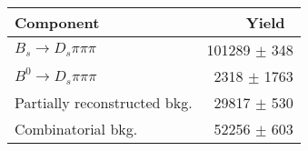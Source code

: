  \begin{tabular}{l r }
\hline\hline
Component & Yield\ \\
\hline
$B_s \to D_s \pi \pi \pi$ & 101289 $\pm$ 348 \\
$B^{0} \to D_s \pi \pi \pi$ & 2318 $\pm$ 1763 \\
Partially reconstructed bkg. & 29817 $\pm$ 530 \\
Combinatorial bkg. & 52256 $\pm$ 603 \\
\hline\hline
\end{tabular}
\label{table:normYields}
